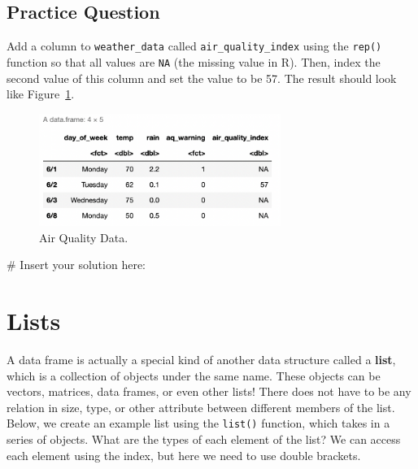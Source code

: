 \documentclass[
  letterpaper,
]{krantz}
\makeatletter
\newenvironment{Shaded}{\begin{snugshade}}{\end{snugshade}}
\newcommand{\CommentTok}[1]{\textcolor[rgb]{0.37,0.37,0.37}{#1}}
\newenvironment{kframe}{%
\medskip{}
\setlength{\fboxsep}{.8em}
 \def\at@end@of@kframe{}%
 \ifinner\ifhmode%
  \def\at@end@of@kframe{\end{minipage}}%
  \begin{minipage}{\columnwidth}%
 \fi\fi%
 \def\FrameCommand##1{\hskip\@totalleftmargin \hskip-\fboxsep
 \colorbox{shadecolor}{##1}\hskip-\fboxsep
     \hskip-\linewidth \hskip-\@totalleftmargin \hskip\columnwidth}%
 \MakeFramed {\advance\hsize-\width
   \@totalleftmargin\z@ \linewidth\hsize
   \@setminipage}}%
 {\par\unskip\endMakeFramed%
 \at@end@of@kframe}
\renewenvironment{Shaded}{\begin{kframe}}{\end{kframe}}
\makeatother
\begin{document}
\hypertarget{practice-question-2}{%
\subsection{Practice Question}\label{practice-question-2}}

Add a column to \texttt{weather\_data} called
\texttt{air\_quality\_index} using the \texttt{rep()} function so that
all values are \texttt{NA} (the missing value in R). Then, index the
second value of this column and set the value to be 57. The result
should look like Figure~\ref{fig-practice-question}.

\begin{figure}

{\centering \includegraphics[width=0.7\textwidth,height=\textheight]{book/images/2-practicequestionanswer.png}

}

\caption{\label{fig-practice-question}Air Quality Data.}

\end{figure}

\begin{Shaded}
\begin{Highlighting}[]
\CommentTok{\# Insert your solution here:}
\end{Highlighting}
\end{Shaded}

\hypertarget{lists}{%
\section{Lists}\label{lists}}

A data frame is actually a special kind of another data structure called
a \textbf{list}, which is a collection of objects under the same name.
These objects can be vectors, matrices, data frames, or even other
lists! There does not have to be any relation in size, type, or other
attribute between different members of the list. Below, we create an
example list using the \texttt{list()} function, which takes in a series
of objects. What are the types of each element of the list? We can
access each element using the index, but here we need to use double
brackets.
\end{document}

